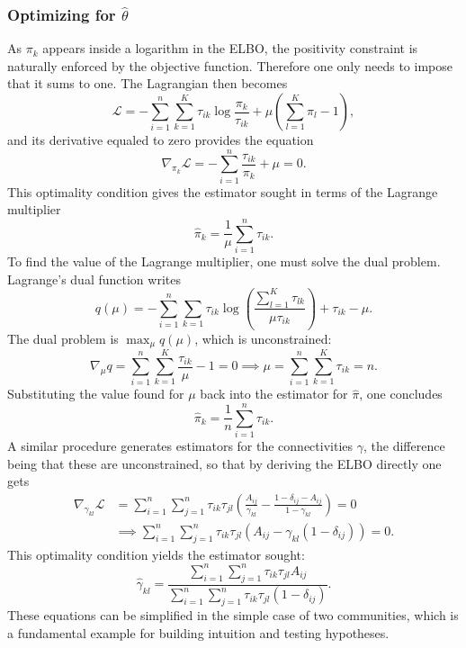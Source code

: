 \documentclass[../../main.tex]{subfiles} %
\begin{document}
\subsubsection{Optimizing for \(\hat \theta\)} As \(\pi_k\) appears inside a
logarithm in the ELBO, the positivity constraint is naturally enforced by the
objective function. Therefore one only needs to impose that it sums to one. The 
Lagrangian then becomes
\begin{equation*}
	\mathscr L = - \sum_{i=1}^n \sum_{k=1}^K \tau_{ik}
	\log{\frac{\pi_k}{\tau_{ik}}} + \mu \left( \sum_{l=1}^K \pi_l -
	1\right),
\end{equation*}
and its derivative equaled to zero provides the equation
\begin{equation*}
	\nabla_{\pi_k} \mathscr L = -\sum_{i=1}^n \frac{\tau_{ik}}{\pi_k} + \mu
	= 0.
\end{equation*}
This optimality condition gives the estimator sought in terms of the Lagrange
multiplier
\begin{equation*}
	\hat \pi_k = \frac{1}{\mu} \sum_{i=1}^n \tau_{ik}.
\end{equation*}
To find the value of the Lagrange multiplier, one must solve the dual problem.
Lagrange's dual function writes
\begin{equation*}
	q \left( \mu \right) = - \sum_{i=1}^n \sum_{k=1} \tau_{ik}
	\log{\left( \frac{\sum_{l=1}^K \tau_{lk}}{\mu \tau_{ik}} \right)} +
	\tau_{ik} - \mu.
\end{equation*}
The dual problem is \(\max_\mu {q(\mu)}\), which is unconstrained:
\begin{equation*}
	\nabla_\mu q = \sum_{i=1}^n \sum_{k=1}^K \frac{\tau_{ik}}{\mu} - 1 = 0
	\implies \mu = \sum_{i=1}^n \sum_{k=1}^K \tau_{ik} = n.
\end{equation*}
Substituting the value found for \(\mu\) back into the estimator for \(\hat
\pi\), one concludes
\begin{equation} \label{eq:pi-hat}
	\hat \pi_k = \frac{1}{n} \sum_{i=1}^n \tau_{ik}.
\end{equation}
A similar procedure generates estimators for the connectivities \(\gamma\), the
difference being that these are unconstrained, so that by deriving the ELBO 
directly one gets
\begin{align*}
	\nabla_{\gamma_{kl}} \mathcal L &= \sum_{i=1}^n \sum_{j=1}^n
	\tau_{ik} \tau_{jl} \left( \frac{A_{ij}}{\gamma_{kl}} -
	\frac{1 - \delta_{ij} - A_{ij}}{1 - \gamma_{kl}} \right) = 0\\
	&\implies \sum_{i=1}^n \sum_{j=1}^n \tau_{ik} \tau_{jl} \left(
	A_{ij} - \gamma_{kl} \left( 1 - \delta_{ij} \right) \right) = 0.
\end{align*}
This optimality condition yields the estimator sought:
\begin{equation} \label{eq:gamma-hat-proof}
	\hat \gamma_{kl} = \frac{\sum_{i=1}^n \sum_{j=1}^n \tau_{ik}
		\tau_{jl} A_{ij}}{\sum_{i=1}^n \sum_{j=1}^n \tau_{ik} \tau_{jl} \left(
		1 - \delta_{ij} \right)}.
\end{equation}
These equations can be simplified in the simple case of two communities, which 
is a fundamental example for building intuition and testing hypotheses.
\end{document}
